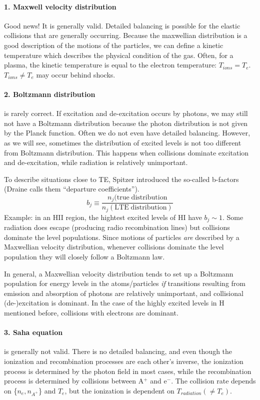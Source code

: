 \documentclass[12pt]{article}
\begin{document}
\paragraph{1. Maxwell velocity distribution} Good news! It is generally
valid. Detailed balancing is possible for the elastic collisions that are
generally occurring. Because the maxwellian distribution is a good
description of the motions of the particles, we can define a kinetic
temperature which describes the physical condition of the gas. Often,
for a plasma, the kinetic temperature is equal to the electron temperature:
$T_{ions} = T_{e}$. $T_{ions} \neq T_{e}$ may occur behind shocks.

\paragraph{2. Boltzmann distribution} is rarely correct.
If excitation and de-excitation occurs by photons, we may still not have a
Boltzmann distribution because the photon distribution is not given by the
Planck function. Often we do not even have detailed balancing.
However, as we will see, sometimes the distribution of excited levels
is not too different from Boltzmann distribution. This happens when collisions
dominate excitation and de-excitation, while radiation is relatively unimportant.

To describe situations close to TE, Spitzer introduced the so-called
b-factors (Draine calls them ``departure coefficients'').
$${ b_{j} \equiv
    \frac{n_{j}(\mathrm{true\; distribution}}{n_{j}(\mathrm{LTE\; distribution})}
}$$
Example: in an HII region, the hightest excited levels of HI have $b_{j} \sim 1$.
Some radiation does escape (producing radio recombination lines) but collisions
dominate the level populations. Since motions of particles \emph{are} described
by a Maxwellian velocity distribution, whenever collisions dominate the level
population they will closely follow a Boltzmann law.

In general, a Maxwellian velocity distribution tends to set up
a Boltzmann population for energy levels in the atoms/particles \emph{if}
transitions resulting from emission and absorption of photons are relatively
unimportant, and collisional (de-)excitation is dominant.
In the case of the highly excited levels in H mentioned before,
collisions with electrons are dominant.

\paragraph{3. Saha equation} is generally not valid. There is no detailed
balancing, and even though the ionization and recombination processes are
each other's inverse, the ionization process is determined by the photon
field in most cases, while the recombination process is determined by collisions
between A$^{+}$ and e$^{-}$. The collision rate depends on \{$n_{e}, n_{A^{+}}$\}
and $T_{e}$, but the ionization is dependent on $T_{radiation} (\neq T_{e})$.
\end{document}
